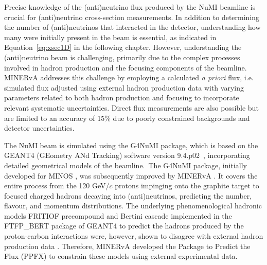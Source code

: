 
Precise knowledge of the (anti)neutrino flux produced by the NuMI beamline is crucial for (anti)neutrino cross-section measurements. In addition to determining the number of (anti)neutrinos that interacted in the detector, understanding how many were initially present in the beam is essential, as indicated in Equation~\ref{eq:xsec1D} in the following chapter. However, understanding the (anti)neutrino beam is challenging, primarily due to the complex processes involved in hadron production and the focusing components of the beamline. MINERvA addresses this challenge by employing a calculated \textit{a priori} flux, i.e. simulated flux adjusted using external hadron production data with varying parameters related to both hadron production and focusing to incorporate relevant systematic uncertainties. Direct flux measurements are also possible \cite{Loiacono2010} but are limited to an accuracy of 15\% due to poorly constrained backgrounds and detector uncertainties. 


The NuMI beam is simulated using the G4NuMI package, which is based on the GEANT4 (GEometry ANd Tracking) software version 9.4.p02~\cite{Geant4_AGOSTINELLI2003250,Geant4_1610988}, incorporating detailed geometrical models of the beamline.~The G4NuMI package, initially developed for MINOS \cite{Pavlovic2008, Koskinen2009, Loiacono2010}, was subsequently improved by MINERvA \cite{AliagaSoplin:2016shs, PhysRevD.94.092005}. It covers the entire process from the 120 GeV/$c$ protons impinging onto the graphite target to focused charged hadrons decaying into (anti)neutrinos, predicting the number, flavour, and momentum distributions. The underlying phenomenological hadronic models FRITIOF precompound \cite{Andersson:1986gw, Nilsson-Almqvist:1986ast} and Bertini cascade \cite{Bertini1963_PhysRev.131.1801,Guthrie:1968ue, Bertini1969_PhysRev.188.1711,BERTINI1971670} implemented in the FTFP\_BERT package of GEANT4 to predict the hadrons produced by the proton-carbon interactions were, however, shown to disagree with external hadron production data \cite{AliagaSoplin:2016shs}.
Therefore, MINERvA developed the Package to Predict the Flux (PPFX) \cite{AliagaSoplin:2016shs,Aliaga_2014} to constrain these models using external experimental data. 


